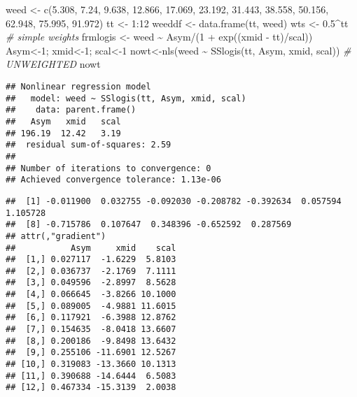\documentclass[
]{article}
\newenvironment{Shaded}{\begin{snugshade}}{\end{snugshade}}
\newcommand{\CommentTok}[1]{\textcolor[rgb]{0.56,0.35,0.01}{\textit{#1}}}
\newcommand{\DecValTok}[1]{\textcolor[rgb]{0.00,0.00,0.81}{#1}}
\newcommand{\FloatTok}[1]{\textcolor[rgb]{0.00,0.00,0.81}{#1}}
\newcommand{\FunctionTok}[1]{\textcolor[rgb]{0.00,0.00,0.00}{#1}}
\newcommand{\NormalTok}[1]{#1}
\newcommand{\OtherTok}[1]{\textcolor[rgb]{0.56,0.35,0.01}{#1}}
\newcommand{\SpecialCharTok}[1]{\textcolor[rgb]{0.00,0.00,0.00}{#1}}
\begin{document}
\begin{Shaded}
\begin{Highlighting}[]
\NormalTok{weed }\OtherTok{\textless{}{-}} \FunctionTok{c}\NormalTok{(}\FloatTok{5.308}\NormalTok{, }\FloatTok{7.24}\NormalTok{, }\FloatTok{9.638}\NormalTok{, }\FloatTok{12.866}\NormalTok{, }\FloatTok{17.069}\NormalTok{, }\FloatTok{23.192}\NormalTok{, }\FloatTok{31.443}\NormalTok{,}
          \FloatTok{38.558}\NormalTok{, }\FloatTok{50.156}\NormalTok{, }\FloatTok{62.948}\NormalTok{, }\FloatTok{75.995}\NormalTok{, }\FloatTok{91.972}\NormalTok{)}
\NormalTok{tt }\OtherTok{\textless{}{-}} \DecValTok{1}\SpecialCharTok{:}\DecValTok{12}
\NormalTok{weeddf }\OtherTok{\textless{}{-}} \FunctionTok{data.frame}\NormalTok{(tt, weed)}
\NormalTok{wts }\OtherTok{\textless{}{-}} \FloatTok{0.5}\SpecialCharTok{\^{}}\NormalTok{tt }\CommentTok{\# simple weights}
\NormalTok{frmlogis }\OtherTok{\textless{}{-}}\NormalTok{ weed }\SpecialCharTok{\textasciitilde{}}\NormalTok{ Asym}\SpecialCharTok{/}\NormalTok{(}\DecValTok{1} \SpecialCharTok{+} \FunctionTok{exp}\NormalTok{((xmid }\SpecialCharTok{{-}}\NormalTok{ tt)}\SpecialCharTok{/}\NormalTok{scal))}
\NormalTok{Asym}\OtherTok{\textless{}{-}}\DecValTok{1}\NormalTok{; xmid}\OtherTok{\textless{}{-}}\DecValTok{1}\NormalTok{; scal}\OtherTok{\textless{}{-}}\DecValTok{1}
\NormalTok{nowt}\OtherTok{\textless{}{-}}\FunctionTok{nls}\NormalTok{(weed }\SpecialCharTok{\textasciitilde{}} \FunctionTok{SSlogis}\NormalTok{(tt, Asym, xmid, scal)) }\CommentTok{\# UNWEIGHTED}
\NormalTok{nowt}
\end{Highlighting}
\end{Shaded}

\begin{verbatim}
## Nonlinear regression model
##   model: weed ~ SSlogis(tt, Asym, xmid, scal)
##    data: parent.frame()
##   Asym   xmid   scal 
## 196.19  12.42   3.19 
##  residual sum-of-squares: 2.59
## 
## Number of iterations to convergence: 0 
## Achieved convergence tolerance: 1.13e-06
\end{verbatim}

\begin{Shaded}
\end{Shaded}

\begin{verbatim}
##  [1] -0.011900  0.032755 -0.092030 -0.208782 -0.392634  0.057594  1.105728
##  [8] -0.715786  0.107647  0.348396 -0.652592  0.287569
## attr(,"gradient")
##           Asym     xmid    scal
##  [1,] 0.027117  -1.6229  5.8103
##  [2,] 0.036737  -2.1769  7.1111
##  [3,] 0.049596  -2.8997  8.5628
##  [4,] 0.066645  -3.8266 10.1000
##  [5,] 0.089005  -4.9881 11.6015
##  [6,] 0.117921  -6.3988 12.8762
##  [7,] 0.154635  -8.0418 13.6607
##  [8,] 0.200186  -9.8498 13.6432
##  [9,] 0.255106 -11.6901 12.5267
## [10,] 0.319083 -13.3660 10.1313
## [11,] 0.390688 -14.6444  6.5083
## [12,] 0.467334 -15.3139  2.0038
\end{verbatim}
\end{document}

